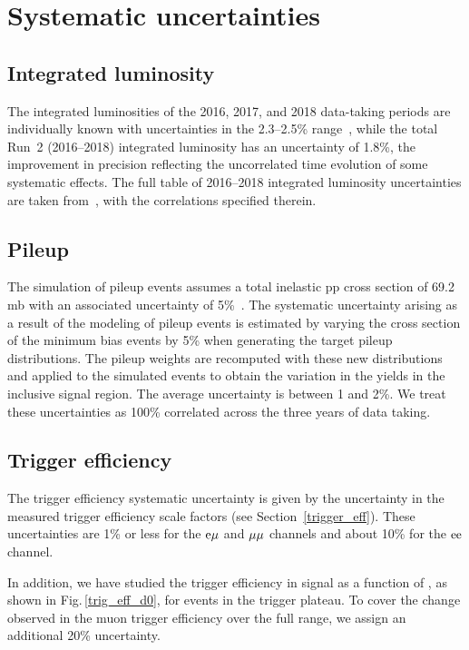 \section{Systematic uncertainties}
\label{systematics}

\subsection{Integrated luminosity}
The integrated luminosities of the 2016, 2017, and 2018 data-taking periods are individually known with uncertainties in the 2.3--2.5\% range~\cite{CMS:lumi2016,CMS:lumi2017,CMS:lumi2018}, while the total Run~2 (2016--2018) integrated luminosity has an uncertainty of 1.8\%, the improvement in precision reflecting the uncorrelated time evolution of some systematic effects. The full table of 2016--2018 integrated luminosity uncertainties are taken from~\cite{lumiTwiki}, with the correlations specified therein.

\subsection{Pileup}
The simulation of pileup events assumes a total inelastic pp cross section of 69.2 mb with an associated uncertainty of 5\%~\cite{Sirunyan:2018nqx}. The systematic uncertainty arising as a result of the modeling of pileup events is estimated by varying the cross section of the minimum bias events by 5\% when generating the target pileup distributions. The pileup weights are recomputed with these new distributions and applied to the simulated events to obtain the variation in the yields in the inclusive signal region. The average uncertainty is between 1 and 2\%. We treat these uncertainties as 100\% correlated across the three years of data taking.


\subsection{Trigger efficiency}
The trigger efficiency systematic uncertainty is given by the uncertainty in the measured trigger efficiency scale factors (see Section~\ref{trigger_eff}). These uncertainties are 1\% or less for the $\mathrm{e}{\mu}$ and ${\mu}{\mu}$ channels and about 10\% for the $\mathrm{e}\mathrm{e}$ channel.

In addition, we have studied the trigger efficiency in signal as a function of \ad, as shown in Fig.\,\ref{trig_eff_d0}, for events in the trigger \pt plateau. To cover the change observed in the muon trigger efficiency over the full \ad range, we assign an additional 20\% uncertainty.

